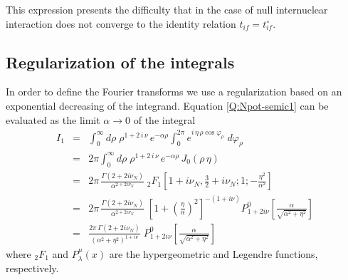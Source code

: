 This expression presents the difficulty that in the case of null
internuclear interaction does not converge to the identity relation
$t_{if}=t^{\circ}_{if}$.

\subsection{Regularization of the integrals}

In order to define the Fourier transforms we use a regularization based
on an exponential decreasing of the integrand. Equation
\ref{Q:Npot-semic1} can be evaluated as the limit $\alpha \to 0$ of the
integral
\begin{eqnarray}\label{Q:Npot-sreg}
I_{1} &=&\int_{0}^{\infty} d \rho \; \rho^{ 1 + 2 \, i \, \nu} \,
e^{- \alpha \rho} \int_{0}^{2 \pi} e^{i \, \eta\, \rho
\cos{\varphi_{\rho}}} \; d \varphi_{\rho} \nonumber
  \\
&=& 2 \pi \int_{0}^{\infty} d \rho \; \rho^{1 + 2 \, i \, \nu}\,
e^{- \alpha \rho} \, J_{0}(\rho \,\eta) \nonumber
  \\
&=& 2 \pi \, \frac{\Gamma \left( 2 + 2 i \nu_{N} \right)}{ \alpha^{2
+ 2 i \nu_{N}}} \; _{2}F_{1}\left[ 1 + i \nu_{N}, \frac{3}{2} +
i \nu_{N} ; 1; -  \frac{\eta^{2}}{\alpha^{2}} \right] \nonumber
  \\
&=& 2 \pi \, \frac{\Gamma \left( 2 + 2 i \nu_{N} \right)}{ \alpha^{2
+ 2 i \nu_{N}}} \; \left[ 1 + \left( \frac{\eta}{\alpha} \right)^{2}
\right]^{-(1+i \nu)} P^{0}_{1 + 2 i \nu} \left[
\frac{\alpha}{\sqrt{\alpha^{2}+ \eta^{2}}} \right] \nonumber
  \\
&=&  \frac{2 \pi \,\Gamma \left( 2 + 2 i \nu_{N} \right)}{
\left({\alpha^{2} + \eta^{2}} \right)^{1+i \nu}} \;  P^{0}_{1 + 2
i \nu} \left[ \frac{\alpha}{\sqrt{\alpha^{2}+ \eta^{2}}} \right]
\end{eqnarray}
%
where $_{2}F_{1}$ and $P^{\mu}_{\lambda}(x)$ are the hypergeometric and
Legendre functions, respectively.

